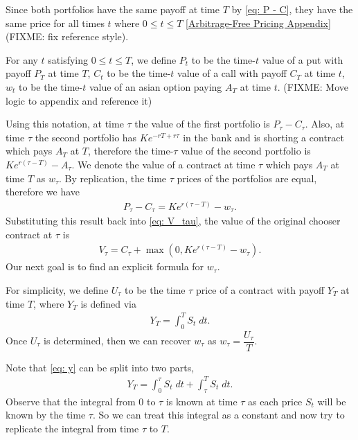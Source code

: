 \documentclass[reqno]{amsart}
\begin{document}
Since both portfolios have the same payoff at time $T$ by \eqref{eq: P - C}, they have the same price for all times $t$ where $0 \leq t \leq T$ \ref{Arbitrage-Free Pricing Appendix} (FIXME: fix reference style). 

For any $t$ satisfying $0 \le t \le T$, we define $P_t$ to be the time-$t$ value of a put with payoff $P_T$ at time $T$, $C_t$ to be the time-$t$ value of a call with payoff $C_T$ at time $t$, $w_t$ to be the time-$t$ value of an asian option paying $A_T$ at time $t$. (FIXME: Move logic to appendix and reference it)

Using this notation, at time $\tau$ the value of the first portfolio is $P_\tau - C_\tau$. Also, at time $\tau$ the second portfolio has $Ke^{-rT + r\tau}$ in the bank and is shorting a contract which pays $A_T$ at $T$, therefore the time-$\tau$ value of the second portfolio is $Ke^{r(\tau - T)} - A_\tau$. We denote the value of a contract at time $\tau$ which pays $A_T$ at time $T$ as $w_\tau$.
By replication, the time $\tau$ prices of the portfolios are equal, therefore we have 
\begin{align}\label{eq: P-C Parity}
     P_\tau - C_\tau = Ke^{r(\tau - T)} - w_\tau.
\end{align}
Substituting this result back into \eqref{eq: V_tau}, the value of the original chooser contract at $\tau$ is
\begin{align}
     V_\tau = C_\tau + \max(0, Ke^{r(\tau - T)} - w_\tau).
\end{align}
Our next goal is to find an explicit formula for $w_\tau$. 

For simplicity, we define $U_\tau$ to be the time $\tau$ price of a contract with payoff $Y_T$ at time $T$, where $Y_T$ is defined via
\begin{align}\label{eq: y}
     Y_T = \int_0^T S_t \; dt.
\end{align}
Once $U_\tau$ is determined, then we can recover $w_\tau$ as $w_\tau = \dfrac{U_\tau}{T}$. 

Note that \eqref{eq: y} can be split into
two parts, 
\begin{align}
     Y_T = \int_0^\tau S_t \; dt + \int_\tau^T S_t \; dt.
\end{align}
Observe that the integral from $0$ to $\tau$ is known at time $\tau$ as each price $S_t$ will be known by the time $\tau$. So we can treat this integral as a constant and now try to replicate the integral from time $\tau$ to $T$.
\end{document}
